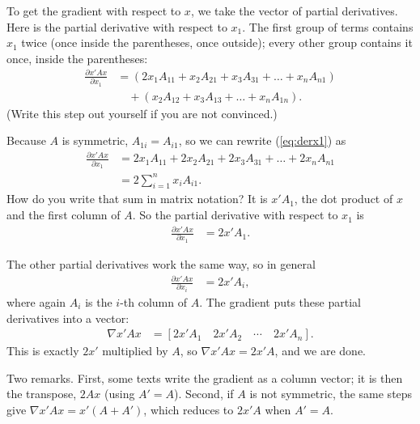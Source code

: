\documentclass[12pt]{article}
\begin{document}
To get the gradient with respect to $x$, we take the vector of partial derivatives. Here is the partial derivative with respect to $x_1$. The first group of terms contains $x_1$ twice (once inside the parentheses, once outside); every other group contains it once, inside the parentheses:
\begin{align}
\frac{\partial x'Ax} { \partial x_1} &= (2x_1  A_{11} + x_2 A_{21} + x_3 A_{31} + \dots + x_n A_{n1}) \nonumber \\
&\quad + (x_2 A_{12} + x_3 A_{13} + \dots + x_n A_{1n}). \label{eq:derx1}
\end{align}
(Write this step out yourself if you are not convinced.)

Because $A$ is symmetric, $A_{1i} = A_{i1}$, so we can rewrite (\ref{eq:derx1}) as
\begin{align}
	\frac{\partial x'Ax} { \partial x_1} &= 2 x_1 A_{11} + 2 x_2 A_{21} + 2 x_3 A_{31} + \dots + 2 x_n A_{n1} \\
	&= 2 \sum_{i = 1}^n x_i A_{i1}.
\end{align}
How do you write that sum in matrix notation? It is $x' A_1$, the dot product of $x$ and the first column of $A$. So the partial derivative with respect to $x_1$ is
\begin{align*}
		\frac{\partial x'Ax} { \partial x_1} &= 2 x' A_1.
\end{align*}

The other partial derivatives work the same way, so in general
\begin{align}
\frac{\partial x'Ax}{\partial x_i} &= 2x'A_i,
\end{align}
where again $A_i$ is the $i$-th column of $A$. The gradient puts these partial derivatives into a vector:
\begin{align*}
\nabla x'Ax &= [2 x' A_1 \quad 2 x' A_2 \quad \cdots \quad 2 x' A_n] .
\end{align*}
This is exactly $2x'$ multiplied by $A$, so $\nabla x'Ax = 2 x' A$, and we are done.

Two remarks. First, some texts write the gradient as a column vector; it is then the transpose, $2Ax$ (using $A' = A$). Second, if $A$ is not symmetric, the same steps give $\nabla x'Ax = x'(A + A')$, which reduces to $2x'A$ when $A' = A$.
\end{document}
